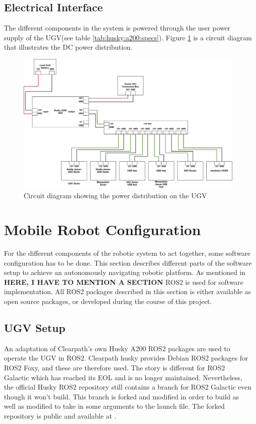 \subsection{Electrical Interface}\label{M:H:ElectricalInterface}
The different components in the system is powered through the user power supply of the UGV(see table \ref{tab:husky:a200:specs}). Figure \ref{fig:circuit_diagram} is a circuit diagram that illustrates the DC power distribution.

\begin{figure}[H]
  \centering
  \includegraphics[width = 1\textwidth]{Figures/circuit_diagram.drawio.png}
  \caption{Circuit diagram showing the power distribution on the UGV}
  \label{fig:circuit_diagram}
\end{figure}

\section{Mobile Robot Configuration}
For the different components of the robotic system to act together, some software configuration has to be done. This section describes different  parts of the software setup to achieve an autonomously navigating robotic platform. As mentioned in \textbf{HERE, I HAVE TO MENTION A SECTION} ROS2 is used for software implementation. All ROS2 packages described in this section is either available as open source packages, or developed during the course of this project.

\subsection{UGV Setup}
An adaptation of Clearpath's own Husky A200 ROS2 packages are used to operate the UGV in ROS2. Clearpath husky provides Debian ROS2 packages for ROS2 Foxy, and these are therefore used. The story is different for ROS2 Galactic which has reached its EOL and is no longer maintained. Nevertheless, the official Husky ROS2 repository\cite{husky_repo} still contains a branch for ROS2 Galactic even though it won't build. This branch is forked and modified in order to build as well as modified to take in some arguments to the launch file. The forked repository is public and available at \cite{uia_husky_repo}. 

